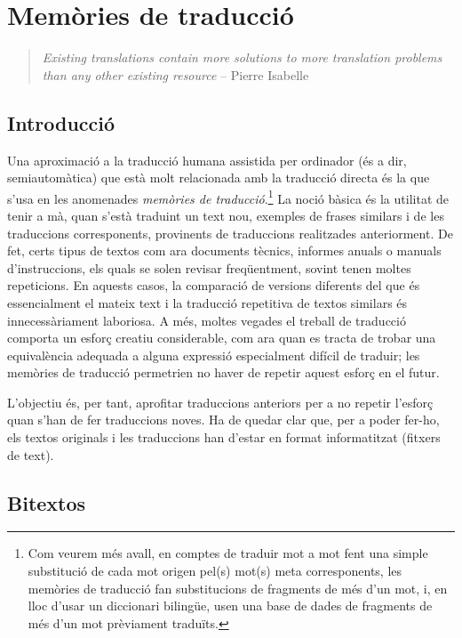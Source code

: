 \chapter{Memòries de traducció}
\label{se:memtrad}


\begin{quote}\textsl{Existing translations contain more solutions to more translation
  problems than any other existing resource} -- Pierre Isabelle
\end{quote}

\section{Introducció}

Una aproximació a la traducció humana assistida per ordinador (és a
dir, semiautomàtica) que està molt relacionada amb la traducció
directa és la que s'usa en les anomenades \emph{memòries de
  traducció}.\footnote{Com veurem més avall, en comptes de traduir mot a mot fent una simple
  substitució de cada mot origen pel(s) mot(s) meta corresponents, les
  memòries de traducció fan substitucions de fragments de més d'un
  mot, i, en lloc d'usar un diccionari bilingüe, usen una base de
  dades de fragments de més d'un mot prèviament traduïts.}  La noció
bàsica \citep{somers96b,samuelson-brown96b} és la utilitat de tenir a
mà, quan s'està traduint un text nou, exemples de frases similars i de
les traduccions corresponents, provinents de traduccions realitzades
anteriorment. De fet, certs tipus de textos com ara documents tècnics,
informes anuals o manuals d'instruccions, els quals se solen revisar
freqüentment, sovint tenen moltes repeticions. En aquests casos, la
comparació de versions diferents del que és essencialment el mateix
text i la traducció repetitiva de textos similars és innecessàriament
laboriosa. A més, moltes vegades el treball de traducció comporta un
esforç creatiu considerable, com ara quan es tracta de trobar una
equivalència adequada a alguna expressió especialment difícil de
traduir; les memòries de traducció permetrien no haver de repetir
aquest esforç en el futur.

L'objectiu és, per tant, aprofitar traduccions anteriors per a no
repetir l'esforç quan s'han de fer traduccions noves. Ha de quedar
clar que, per a poder fer-ho, els textos originals i les traduccions
han d'estar en format informatitzat (fitxers de text).

\section{Bitextos}
\label{ss:bitextos}

